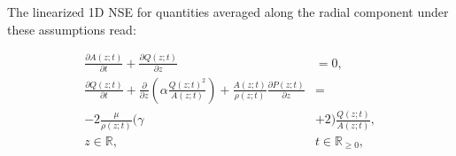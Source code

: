 \documentclass[a4paper, oneside]{discothesis}
\begin{document}
The linearized 1D NSE for quantities averaged along the radial component under these assumptions read:

\begin{equation}
		\begin{aligned} 
			\frac{\partial A(z;t)}{\partial t} + \frac{\partial Q(z;t)}{\partial z} &= 0, \\ 
			\frac{\partial Q(z;t)}{\partial t} + \frac{\partial}{\partial z}\left(\alpha \frac{Q(z;t)^2}{A(z;t)} \right) + \frac{A(z;t)}{\rho(z;t)} \frac{\partial P(z;t)}{\partial z} &= \\
			-2 \frac{\mu}{\rho(z;t)} ( \gamma &+ 2 ) \frac{Q(z;t)}{A(z;t)}, \\
			z \in \mathbb{R},\ & t \in \mathbb{R}_{\geq 0}, 
		\end{aligned} \label{eq:1Deqs1}
\end{equation}
\end{document}
